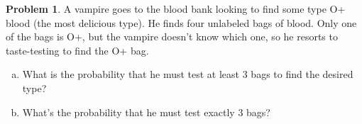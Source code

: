 \documentclass[10pt]{amsart}
\theoremstyle{definition}
\newcommand{\dicegamesanswerbox}[1][\phantom{E}]{\begin{flushright}\framebox[2cm]{\begin{minipage}{.3in}\vspace{.07in}\begin{flushright}\hfill#1\hfill\end{flushright} \vfill \vspace{.16in}\end{minipage}\hfill}\end{flushright}}
\newtheorem{problem}{Problem} %
\def\P{\mathbb{P}} %
\begin{document}
\begin{problem}
  A vampire goes to the blood bank looking to find some type O+ blood (the most delicious type). He finds
  four unlabeled bags of blood. Only one of the bags is O+, but the vampire doesn't know which one, so he
  resorts to taste-testing to find the O+ bag.

  \begin{enumerate}[(a)]
    \item  What is the probability that he must test at
    least 3 bags to find the desired type?
    \vspace{5.75cm} %

    \item What's the probability that he must test exactly $3$ bags?
    \vspace{2.75cm} %
  \end{enumerate}
\end{problem}
\end{document}
